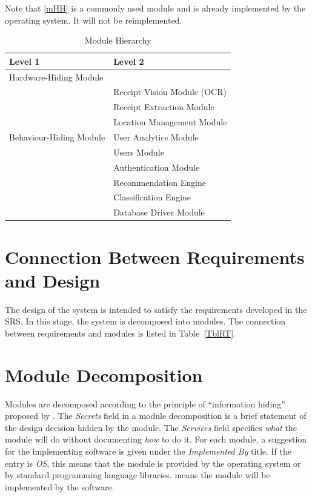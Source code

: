 \documentclass[12pt, titlepage]{article}
\begin{document}
Note that \ref{mHH} is a commonly used module and is already implemented by the operating system.
It will not be reimplemented.

\begin{table}[h!]
\centering
\begin{tabular}{p{} p{}}
\toprule
\textbf{Level 1} & \textbf{Level 2}\\
\midrule

{Hardware-Hiding Module} & ~ \\
\midrule

\multirow{7}{0.3\textwidth}{Behaviour-Hiding Module} & Receipt Vision Module (OCR)\\
& Receipt Extraction Module\\
& Location Management Module\\
& User Analytics Module\\
& Users Module\\
& Authentication Module\\
\midrule

\multirow{3}{0.3\textwidth}{Software Decision Module} & Recommendation Engine\\
& Classification Engine\\
& Database Driver Module\\
\bottomrule

\end{tabular}
\caption{Module Hierarchy}
\label{TblMH}
\end{table}

\section{Connection Between Requirements and Design} \label{SecConnection}

The design of the system is intended to satisfy the requirements developed in
the SRS. In this stage, the system is decomposed into modules. The connection
between requirements and modules is listed in Table~\ref{TblRT}.

\section{Module Decomposition} \label{SecMD}

Modules are decomposed according to the principle of ``information hiding''
proposed by \citet{ParnasEtAl1984}. The \emph{Secrets} field in a module
decomposition is a brief statement of the design decision hidden by the
module. The \emph{Services} field specifies \emph{what} the module will do
without documenting \emph{how} to do it. For each module, a suggestion for the
implementing software is given under the \emph{Implemented By} title. If the
entry is \emph{OS}, this means that the module is provided by the operating
system or by standard programming language libraries.  \emph{\progname{}} means the
module will be implemented by the \progname{} software.
\end{document}
